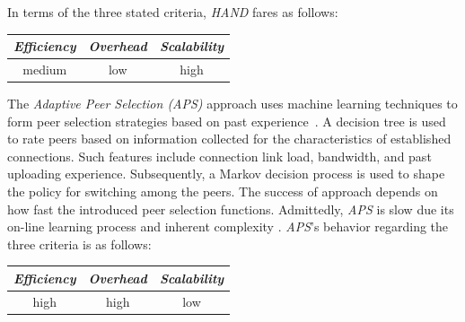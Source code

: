 In terms of the three stated criteria, \emph{HAND} fares as follows:
\begin{center}
{\footnotesize
\begin{tabular}{ccc}
\emph{Efficiency} & \emph{Overhead} & \emph{Scalability} \\
\hline
medium &
low &
high
\end{tabular}
}
\end{center}

The \emph{Adaptive Peer Selection (APS)} approach uses 
machine learning techniques to form peer selection strategies based on past
experience~\cite{BFLZ2003}. A decision tree is used to rate peers based on
information collected for the characteristics of established connections. Such
features include connection link load, bandwidth, and past uploading experience.
Subsequently, a Markov decision process is used
to shape the policy for switching among the peers. The success of approach depends on
how fast the introduced peer selection functions. Admittedly, \emph{APS} is slow 
due its on-line learning process and inherent complexity \cite{ZZLZ2009}. 
\emph{APS}'s behavior regarding the three criteria is as follows:
\begin{center}
{\footnotesize
\begin{tabular}{ccc}
\emph{Efficiency} & \emph{Overhead} & \emph{Scalability} \\
\hline
high &
high &
low
\end{tabular}
}
\end{center}

